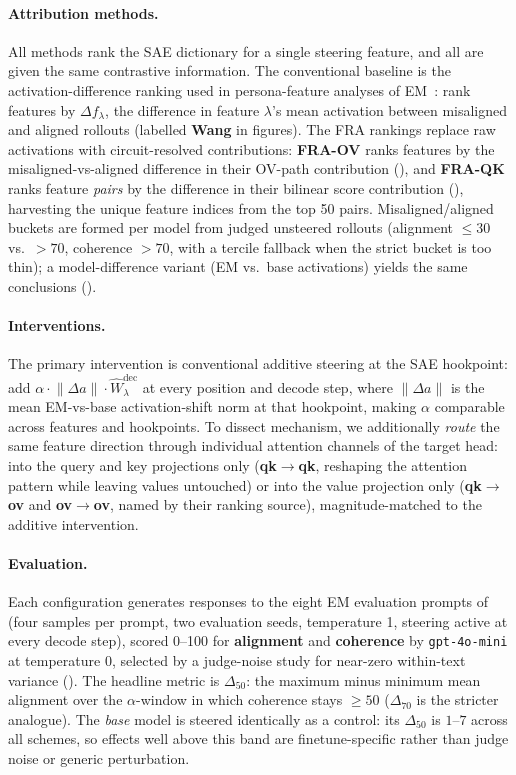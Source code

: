 \documentclass{article}
\theoremstyle{plain}
\theoremstyle{definition}
\theoremstyle{remark}
\begin{document}
\paragraph{Attribution methods.} All methods rank the SAE dictionary for a single steering feature, and all are given the same contrastive information. The conventional baseline is the activation-difference ranking used in persona-feature analyses of EM~\citep{wang2025persona}: rank features by $\Delta f_\lambda$, the difference in feature $\lambda$'s mean activation between misaligned and aligned rollouts (labelled \textbf{Wang} in figures). The FRA rankings replace raw activations with circuit-resolved contributions: \textbf{FRA-OV} ranks features by the misaligned-vs-aligned difference in their OV-path contribution (), and \textbf{FRA-QK} ranks feature \emph{pairs} by the difference in their bilinear score contribution (), harvesting the unique feature indices from the top 50 pairs. Misaligned/aligned buckets are formed per model from judged unsteered rollouts (alignment $\le 30$ vs.\ $>70$, coherence $>70$, with a tercile fallback when the strict bucket is too thin); a model-difference variant (EM vs.\ base activations) yields the same conclusions ().

\paragraph{Interventions.} The primary intervention is conventional additive steering at the SAE hookpoint: add $\alpha \cdot \lVert \Delta a \rVert \cdot \widehat{W}^{\mathrm{dec}}_\lambda$ at every position and decode step, where $\lVert \Delta a \rVert$ is the mean EM-vs-base activation-shift norm at that hookpoint, making $\alpha$ comparable across features and hookpoints. To dissect mechanism, we additionally \emph{route} the same feature direction through individual attention channels of the target head: into the query and key projections only (\textbf{qk$\to$qk}, reshaping the attention pattern while leaving values untouched) or into the value projection only (\textbf{qk$\to$ov} and \textbf{ov$\to$ov}, named by their ranking source), magnitude-matched to the additive intervention.

\paragraph{Evaluation.} Each configuration generates responses to the eight EM evaluation prompts of \citet{emergent_misalignment} (four samples per prompt, two evaluation seeds, temperature 1, steering active at every decode step), scored 0--100 for \textbf{alignment} and \textbf{coherence} by \texttt{gpt-4o-mini} at temperature 0, selected by a judge-noise study for near-zero within-text variance (). The headline metric is $\Delta_{50}$: the maximum minus minimum mean alignment over the $\alpha$-window in which coherence stays $\ge 50$ ($\Delta_{70}$ is the stricter analogue). The \emph{base} model is steered identically as a control: its $\Delta_{50}$ is $1$--$7$ across all schemes, so effects well above this band are finetune-specific rather than judge noise or generic perturbation.
\end{document}
